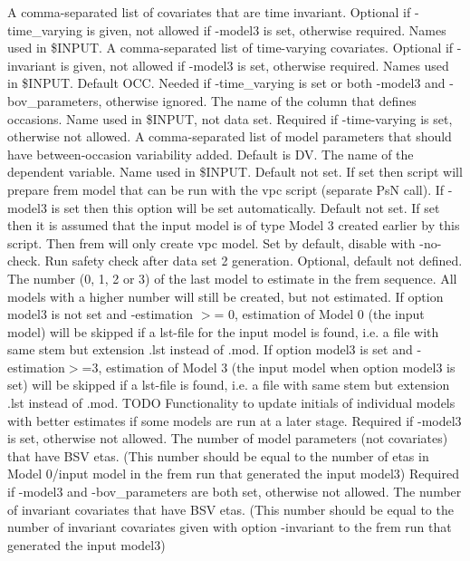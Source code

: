 \begin{optionlist}
A comma-separated list of covariates that are time invariant. Optional if -time\_varying is given, not allowed if -model3 is set, otherwise required. Names used in \$INPUT. 
\nextopt
{}
A comma-separated list of time-varying covariates. Optional if -invariant is given, not allowed if -model3 is set, otherwise required. Names used in \$INPUT. 
\nextopt
{}
Default OCC. Needed if -time\_varying is set or both -model3 and -bov\_parameters, otherwise ignored. The name of the column that defines occasions. Name used in \$INPUT, not data set. 
\nextopt
{}
Required if -time-varying is set, otherwise not allowed. A comma-separated list of model parameters that should have between-occasion variability added. 
\nextopt
{}
Default is DV. The name of the dependent variable. Name used in \$INPUT. 
\nextopt
{}
Default not set. If set then script will prepare frem model that can be run with the vpc script (separate PsN call). If -model3 is set then this option will be set automatically.  
\nextopt
{}
Default not set. If set then it is assumed that the input model is of type Model 3 created earlier by this script. Then frem will only create vpc model.  
\nextopt
{}
Set by default, disable with -no-check. Run safety check after data set 2 generation. 
\nextopt
{}
Optional, default not defined. The number (0, 1, 2 or 3) of the last model to estimate in the frem sequence. All models with a higher number will still be created, but not estimated. If option model3 is not set and -estimation $>$= 0, estimation of Model 0 (the input model) will be skipped if a lst-file for the input model is found, i.e. a file with same stem but extension .lst instead of .mod. If option model3 is set and -estimation$>$=3, estimation of Model 3 (the input model when option model3 is set) will be skipped if a lst-file is found, i.e. a file with same stem but extension .lst instead of .mod. TODO Functionality to update initials of individual models with better estimates if some models are run at a later stage. 
\nextopt
{}
Required if -model3 is set, otherwise not allowed. The number of model parameters (not covariates) that have BSV etas. (This number should be equal to the number of etas in Model 0/input model in the frem run that generated the input model3) 
\nextopt
{}
Required if -model3 and -bov\_parameters are both set, otherwise not allowed. The number of invariant covariates that have BSV etas. (This number should be equal to the number of invariant covariates given with option -invariant to the frem run that generated the input model3) 

\end{optionlist}
